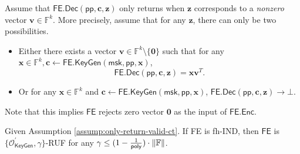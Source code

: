 \begin{assumption}
\label{assump:only-return-valid-ct}
Assume that $\textsf{FE.Dec}(\textsf{pp}, \mathbf{c}, \mathbf{z})$ only returns when $\mathbf{z}$ corresponds to a \emph{nonzero} vector $\mathbf{v} \in \mathbb{F}^k$. More precisely, assume that for any $\mathbf{z}$, there can only be two possibilities.

\begin{itemize}
	\item Either there exists a vector $\mathbf{v} \in \mathbb{F}^k \setminus \{\mathbf{0}\}$ such that for any $\mathbf{x} \in \mathbb{F}^k, \mathbf{c} \gets \textsf{FE.KeyGen}(\textsf{msk}, \textsf{pp}, \mathbf{x})$, 
	\[
		\textsf{FE.Dec}(\textsf{pp}, \mathbf{c}, \mathbf{z}) = \mathbf{x}\mathbf{v}^T.
	\]
	\item Or for any $\mathbf{x} \in \mathbb{F}^k$ and $ \mathbf{c} \gets \textsf{FE.KeyGen}(\textsf{msk}, \textsf{pp}, \mathbf{x})$, $\textsf{FE.Dec}(\textsf{pp}, \mathbf{c}, \mathbf{z}) \to \bot$.

\end{itemize}
Note that this implies $\textsf{FE}$ rejects zero vector $\mathbf{0}$ as the input of $\textsf{FE.Enc}$.
\end{assumption}

\begin{theorem}
\label{thm:fh-IPFE:ind-OKeyGen-gamma-ruf}
Given Assumption \ref{assump:only-return-valid-ct}. If \textsf{FE} is fh-IND, then $\textsf{FE}$ is $\{ \mathcal{O}^\prime_{\textsf{KeyGen}}, \gamma \}$-RUF for any $\gamma \leq (1 - \frac{1}{\mathsf{poly}}) \cdot \|\mathbb{F}\|$.

\end{theorem}

